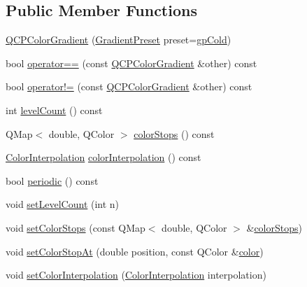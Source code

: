 \subsection*{Public Member Functions}
\begin{DoxyCompactItemize}
\item 
\hyperlink{classQCPColorGradient_a546e44df5fa1846400a582c041361c85}{Q\+C\+P\+Color\+Gradient} (\hyperlink{classQCPColorGradient_aed6569828fee337023670272910c9072}{Gradient\+Preset} preset=\hyperlink{classQCPColorGradient_aed6569828fee337023670272910c9072aec8c001f62c0d5cb853db5fd85309557}{gp\+Cold})
\item 
bool \hyperlink{classQCPColorGradient_aada47d8206bf2cec77462653bf471c13}{operator==} (const \hyperlink{classQCPColorGradient}{Q\+C\+P\+Color\+Gradient} \&other) const 
\item 
bool \hyperlink{classQCPColorGradient_ac641f5d2dc1686201d3cb602c871791d}{operator!=} (const \hyperlink{classQCPColorGradient}{Q\+C\+P\+Color\+Gradient} \&other) const 
\item 
int \hyperlink{classQCPColorGradient_ae7537a8e6d0fed3f1928328062bb0f4e}{level\+Count} () const 
\item 
Q\+Map$<$ double, Q\+Color $>$ \hyperlink{classQCPColorGradient_a64f8aba7826f9c6363aacff8376cef37}{color\+Stops} () const 
\item 
\hyperlink{classQCPColorGradient_ac5dca17cc24336e6ca176610e7f77fc1}{Color\+Interpolation} \hyperlink{classQCPColorGradient_a731616fabe6f2e33f71f58dd382359d8}{color\+Interpolation} () const 
\item 
bool \hyperlink{classQCPColorGradient_a860b7048f877195d2a0fb8d5a7cf5d73}{periodic} () const 
\item 
void \hyperlink{classQCPColorGradient_a18da587eb4f7fc788ea28ba15b6a12de}{set\+Level\+Count} (int n)
\item 
void \hyperlink{classQCPColorGradient_a724e828aa6f0ba5011a9392477c35d3a}{set\+Color\+Stops} (const Q\+Map$<$ double, Q\+Color $>$ \&\hyperlink{classQCPColorGradient_a64f8aba7826f9c6363aacff8376cef37}{color\+Stops})
\item 
void \hyperlink{classQCPColorGradient_a3b48be5e78079db1bb2a1188a4c3390e}{set\+Color\+Stop\+At} (double position, const Q\+Color \&\hyperlink{classQCPColorGradient_a0599545c859268b025d2060dea741cea}{color})
\item 
void \hyperlink{classQCPColorGradient_aa13fda86406e1d896a465a409ae63b38}{set\+Color\+Interpolation} (\hyperlink{classQCPColorGradient_ac5dca17cc24336e6ca176610e7f77fc1}{Color\+Interpolation} interpolation)

\end{DoxyCompactItemize}
